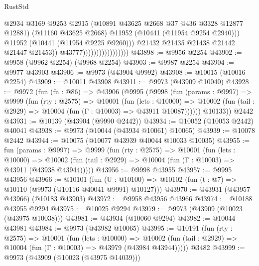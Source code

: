 \begin{lexlean}{RustStd}
\begin{coremodule}
                                              @2934
                                              @3169
                                              @9253
                                              @2915
                                              (@10891 @43625 @2668 @37 @436 @3328 @12877 @12881)
                                              (@11160 @43625 @2668)
                                              @11952
                                              (@10441 (@11954 @9254 @2940)))
                                            @11952
                                            (@10441 (@11954 @9225 @9260)))
                                          @21432
                                          @21435
                                          @21438
                                          @21442
                                          @21447
                                          @21453))
                                      @43777)))))))))))))))))
@43898 := @9956 @2254
@43902 := @9958 (@9962 @2254) (@9968 @2254)
@43903 := @9987 @2254
@43904 := @9977 @43903
@43906 := @9973 (@43904 @9992)
@43908 := @10015 (@10016 @2254)
@43909 := @10011 @43908
@43911 := @9973 (@43909 @10040)
@43928 := @9972
    (fun (fn : @86) =>
    @43906
      (@9995
        (@9998
          (fun (params : @9997) =>
          @9999
            (fun (rty : @2575) =>
            @10001
              (fun (lets : @10000) =>
              @10002 (fun (tail : @2929) => @10004 (fun (Γ : @10003) => @43911 @10087))))))
        @10133))
    @2442
@43931 := @10139 (@43904 (@9990 @2442))
@43934 := @10052 (@10053 @2442) @40041
@43938 := @9973 (@10044 (@43934 @10061) @10065)
@43939 := @10078 @2442
@43944 := @10075 (@10077 @43939 @40044 @10033 @10035)
@43955 := fun (params : @9997) =>
  @9999
    (fun (rty : @2575) =>
    @10001
      (fun (lets : @10000) =>
      @10002 (fun (tail : @2929) => @10004 (fun (Γ : @10003) => @43911 (@43938 @43944)))))
@43956 := @9998 @43955
@43957 := @9995 @43956
@43966 := @10101
    (fun (U : @10100) => @10102 (fun (t : @7) => @10110 (@9973 (@10116 @40041 @9991) @10127)))
@43970 := @43931 (@43957 @43966) (@10183 @43903)
@43972 := @9958 @43956 @43966
@43974 := @10188 @43955 @9294
@43975 := @10025 @9294
@43979 := @9973 (@43909 (@10023 (@43975 @10038)))
@43981 := @43934 (@10060 @9294)
@43982 := @10044 @43981
@43984 := @9973 (@43982 @10065)
@43995 := @10191
    (fun (rty : @2575) =>
    @10001
      (fun (lets : @10000) =>
      @10002 (fun (tail : @2929) => @10004 (fun (Γ : @10003) => @43979 (@43984 @43944)))))
    @3482
@43999 := @9973 (@43909 (@10023 (@43975 @14039)))

\end{coremodule}
\end{lexlean}
